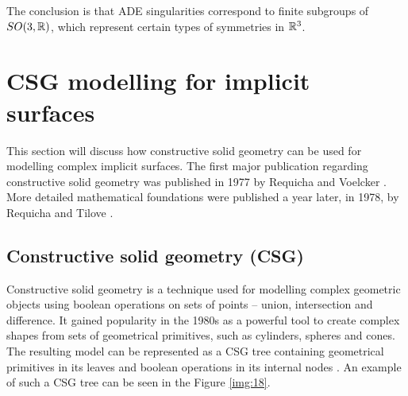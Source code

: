 The conclusion is that ADE singularities correspond to finite subgroups of
$SO(3, \mathbb{R})$, which represent certain types of symmetries in $\mathbb{R}^3$.

\section{CSG modelling for implicit surfaces}
\label{sub2.6}
This section will discuss how constructive solid geometry can be used for
modelling complex implicit surfaces. The first major publication regarding constructive
solid geometry was published in 1977 by Requicha and Voelcker \cite{requicha1977constructive}.
More detailed mathematical foundations were published a year later, in 1978, by
Requicha and Tilove \cite{requicha1978mathematical}.
\subsection{Constructive solid geometry (CSG)}
Constructive solid geometry is a technique used for modelling complex geometric
objects using boolean operations on sets of points -- union, intersection and
difference. It gained popularity in the 1980s as a powerful tool to create complex
shapes from sets of geometrical primitives, such as cylinders, spheres and cones.
The resulting model can be represented as a CSG tree containing geometrical
primitives in its leaves and boolean operations in its internal nodes 
\cite{foley1996computer}. An example of such a CSG tree can be seen in the Figure 
\ref{img:18}.

